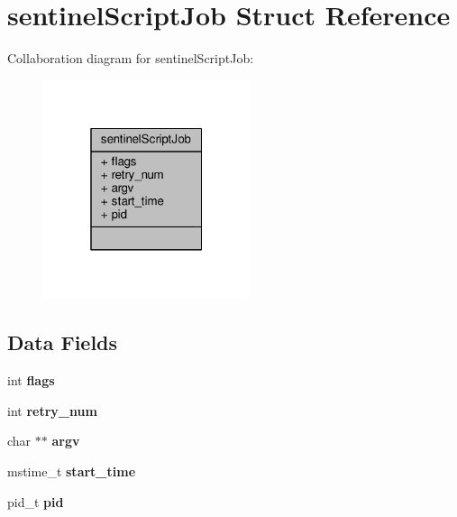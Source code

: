 \hypertarget{structsentinelScriptJob}{}\section{sentinel\+Script\+Job Struct Reference}
\label{structsentinelScriptJob}


Collaboration diagram for sentinel\+Script\+Job\+:\nopagebreak
\begin{figure}[H]
\begin{center}
\leavevmode
\includegraphics[width=172pt]{structsentinelScriptJob__coll__graph}
\end{center}
\end{figure}
\subsection*{Data Fields}
\begin{DoxyCompactItemize}
\item 
\mbox{\label{structsentinelScriptJob_ab4c41e8ccf4d10724e60e31c2afef66d}} 
int {\bfseries flags}
\item 
\mbox{\label{structsentinelScriptJob_a5b4ae5f72e1c4f78d9da89215c09209a}} 
int {\bfseries retry\+\_\+num}
\item 
\mbox{\label{structsentinelScriptJob_a22239ba0586d6dfc9ec851770c4a037f}} 
char $\ast$$\ast$ {\bfseries argv}
\item 
\mbox{\label{structsentinelScriptJob_ad6712c2b32d36dcbed250929223a9875}} 
mstime\+\_\+t {\bfseries start\+\_\+time}
\item 
\mbox{\label{structsentinelScriptJob_af4d221bd4ff2ba04b2be3b17360ae4c1}} 
pid\+\_\+t {\bfseries pid}
\end{DoxyCompactItemize}



